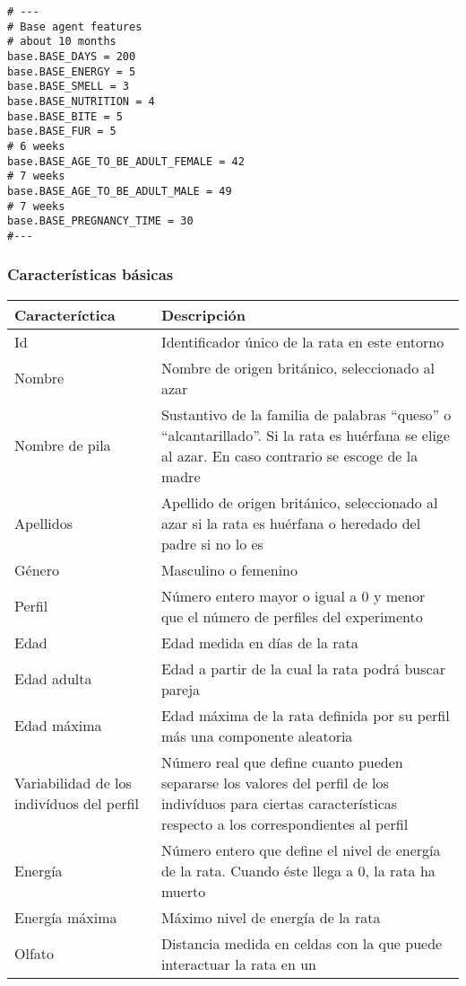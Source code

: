 \begin{verbatim}
# ---
# Base agent features
# about 10 months
base.BASE_DAYS = 200
base.BASE_ENERGY = 5
base.BASE_SMELL = 3
base.BASE_NUTRITION = 4
base.BASE_BITE = 5
base.BASE_FUR = 5
# 6 weeks
base.BASE_AGE_TO_BE_ADULT_FEMALE = 42
# 7 weeks
base.BASE_AGE_TO_BE_ADULT_MALE = 49
# 7 weeks
base.BASE_PREGNANCY_TIME = 30
#---
\end{verbatim}

\subsubsection{Características básicas}


\begin{table}[h]
\centering %
\begin{tabular}{| p{3cm} | p{10cm} |} %
\hline\hline
Caracteríctica & Descripción\\
\hline %
Id & Identificador único de la rata en este entorno \\
Nombre & Nombre de origen británico, seleccionado al azar\\
Nombre de pila & Sustantivo de la familia de palabras ``queso'' o
``alcantarillado''. Si la rata es huérfana se elige al azar. En caso contrario
se escoge de la madre \\
Apellidos & Apellido de origen británico, seleccionado al azar si la rata es
huérfana o heredado del padre si no lo es \\
Género & Masculino o femenino \\
Perfil & Número entero mayor o igual a 0 y menor que el número de perfiles del
experimento \\
Edad & Edad medida en días de la rata \\
Edad adulta & Edad a partir de la cual la rata podrá buscar pareja \\
Edad máxima & Edad máxima de la rata definida por su perfil más una componente
aleatoria \\
Variabilidad de los indivíduos del perfil & Número real que define cuanto
pueden separarse los valores del perfil de los indivíduos para ciertas
características respecto a los correspondientes al perfil\\
Energía & Número entero que define el nivel de energía de la rata. Cuando éste
llega a 0, la rata ha muerto \\
Energía máxima & Máximo nivel de energía de la rata \\
Olfato & Distancia medida en celdas con la que puede interactuar la rata en un

\end{tabular}
\end{table}
